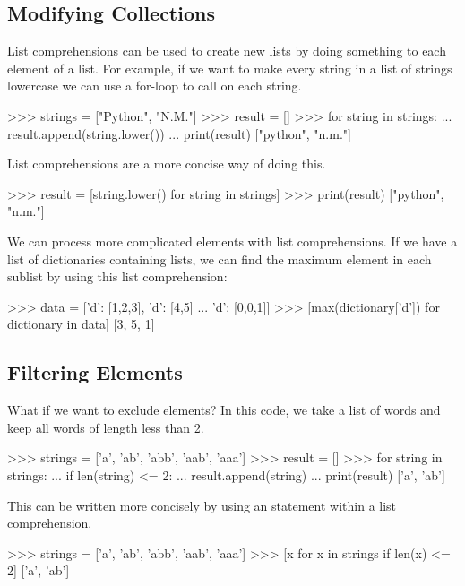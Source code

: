 \documentclass[11pt]{cselabheader}
\begin{document}
\subsection{Modifying Collections}

List comprehensions can be used to create new lists by doing something to
each element of a list. For example, if we want to make every string in a list
of strings lowercase we can use a for-loop to call 
on each string.

\begin{pyconcode}
>>> strings = ["Python", "N.M."]
>>> result = []
>>> for string in strings:
...    result.append(string.lower())
... print(result)
["python", "n.m."]
\end{pyconcode}

List comprehensions are a more concise way of doing this.

\begin{pyconcode}
>>> result = [string.lower() for string in strings]
>>> print(result)
["python", "n.m."]
\end{pyconcode}

We can process more complicated elements with list comprehensions.
If we have a list of dictionaries containing lists, we can find the maximum
element in each sublist by using this list comprehension:

\begin{pyconcode}
>>> data = [{'d': [1,2,3]}, {'d': [4,5]}
...         {'d': [0,0,1]}]
>>> [max(dictionary['d']) for dictionary in data]
[3, 5, 1]
\end{pyconcode}

\subsection{Filtering Elements}

What if we want to exclude elements? In this code, we take a list of words
and keep all words of length less than 2.

\begin{pyconcode}
>>> strings = ['a', 'ab', 'abb', 'aab', 'aaa']
>>> result = []
>>> for string in strings:
...    if len(string) <= 2:
...        result.append(string)
... print(result)
['a', 'ab']
\end{pyconcode}

This can be written more concisely by using an 
statement within a list comprehension.

\begin{pyconcode}
>>> strings = ['a', 'ab', 'abb', 'aab', 'aaa']
>>> [x for x in strings if len(x) <= 2]
['a', 'ab']
\end{pyconcode}
\end{document}
